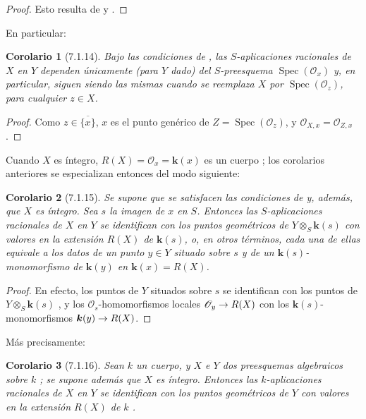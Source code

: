 \documentclass[oneside]{amsart}
\theoremstyle{ega-env-style}
\theoremstyle{ega-thm-env-style}
\newtheorem*{corollary}{Corolario}
\theoremstyle{ega-defn-env-style}
\renewcommand{\to}{\mathchoice{\longrightarrow}{\rightarrow}{\rightarrow}{\rightarrow}}
\let\EGAOriginalLabel\label
\renewcommand{\label}[1]{\phantomsection\EGAOriginalLabel{#1}}
\begin{document}
\begin{proof}
Esto resulta de  y .
\end{proof}

En particular:
\begin{corollary}[7.1.14]
\label{I.7.1.14}
Bajo las condiciones de , las $S$-aplicaciones racionales de $X$ en $Y$ dependen únicamente (para $Y$ dado) del $S$-preesquema $\operatorname{Spec}(\mathscr{O}_x)$ y, en particular, siguen siendo las mismas cuando se reemplaza $X$ por $\operatorname{Spec}(\mathscr{O}_z)$, para cualquier $z\in X$.
\end{corollary}

\begin{proof}
Como $z\in\overline{\{x\}}$, $x$ es el punto genérico de $Z=\operatorname{Spec}(\mathscr{O}_z)$, y $\mathscr{O}_{X,x}=\mathscr{O}_{Z,x}$.
\end{proof}

Cuando $X$ es íntegro, $R(X)=\mathscr{O}_x=\boldsymbol{k}(x)$ es un cuerpo ; los corolarios anteriores se especializan entonces del modo siguiente:
\begin{corollary}[7.1.15]
\label{I.7.1.15}
Se supone que se satisfacen las condiciones de  y, además, que $X$ es íntegro.
Sea $s$ la imagen de $x$ en $S$.
Entonces las $S$-aplicaciones racionales de $X$ en $Y$ se identifican con los puntos geométricos de $Y\otimes_S \boldsymbol{k}(s)$ con valores en la extensión $R(X)$ de $\boldsymbol{k}(s)$, o, en otros términos, cada una de ellas equivale a los datos de un punto $y\in Y$ situado sobre $s$ y de un $\boldsymbol{k}(s)$-monomorfismo de $\boldsymbol{k}(y)$ en $\boldsymbol{k}(x)=R(X)$.
\end{corollary}

\begin{proof}
En efecto, los puntos de $Y$ situados sobre $s$ se identifican con los puntos de $Y\otimes_S \boldsymbol{k}(s)$ , y los $\mathscr{O}_s$-homomorfismos locales $\mathscr{O}_y\to R(X)$ con los $\boldsymbol{k}(s)$-monomorfismos $\boldsymbol{k}(y)\to R(X)$.
\end{proof}

Más precisamente:
\begin{corollary}[7.1.16]
\label{I.7.1.16}
Sean $k$ un cuerpo, y $X$ e $Y$ dos preesquemas algebraicos sobre $k$ ; se supone además que $X$ es íntegro.
Entonces las $k$-aplicaciones racionales de $X$ en $Y$ se identifican con los puntos geométricos de $Y$ con valores en la extensión $R(X)$ de $k$ .
\end{corollary}
\end{document}
